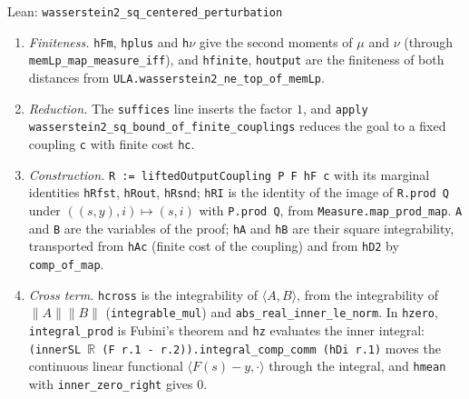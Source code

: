\documentclass[11pt,a4paper]{article}
\begin{document}
\begin{leanbox}{Lean: \texttt{wasserstein2\_\allowbreak{}sq\_\allowbreak{}centered\_\allowbreak{}perturbation}}
\begin{enumerate}


\item \emph{Finiteness.} \texttt{h\allowbreak{}Fm}, \texttt{hplus} and \texttt{h\ensuremath{\nu}} give the second moments of \(\mu\) and \(\nu\) (through \texttt{mem\allowbreak{}Lp\_\allowbreak{}map\_\allowbreak{}measure\_\allowbreak{}iff}), and \texttt{hfinite}, \texttt{houtput} are the finiteness of both distances from \texttt{ULA.\allowbreak{}wasserstein2\_\allowbreak{}ne\_\allowbreak{}top\_\allowbreak{}of\_\allowbreak{}mem\allowbreak{}Lp}.

\item \emph{Reduction.} The \texttt{suffices} line inserts the factor \(1\), and \texttt{apply wasserstein2\_\allowbreak{}sq\_\allowbreak{}bound\_\allowbreak{}of\_\allowbreak{}finite\_\allowbreak{}couplings} reduces the goal to a fixed coupling \texttt{c} with finite cost \texttt{hc}.

\item \emph{Construction.} \texttt{R := lifted\allowbreak{}Output\allowbreak{}Coupling P F h\allowbreak{}F c} with its marginal identities \texttt{h\allowbreak{}Rfst}, \texttt{h\allowbreak{}Rout}, \texttt{h\allowbreak{}Rsnd}; \texttt{h\allowbreak{}RI} is the identity of the image of \texttt{R.\allowbreak{}prod Q} under \(((s,y),i)\mapsto(s,i)\) with \texttt{P.\allowbreak{}prod Q}, from \texttt{Measure.\allowbreak{}map\_\allowbreak{}prod\_\allowbreak{}map}. \texttt{A} and \texttt{B} are the variables of the proof; \texttt{h\allowbreak{}A} and \texttt{h\allowbreak{}B} are their square integrability, transported from \texttt{h\allowbreak{}Ac} (finite cost of the coupling) and from \texttt{h\allowbreak{}D2} by \texttt{comp\_\allowbreak{}of\_\allowbreak{}map}.

\item \emph{Cross term.} \texttt{hcross} is the integrability of \(\langle A,B\rangle\), from the integrability of \(\|A\|\|B\|\) (\texttt{integrable\_\allowbreak{}mul}) and \texttt{abs\_\allowbreak{}real\_\allowbreak{}inner\_\allowbreak{}le\_\allowbreak{}norm}. In \texttt{hzero}, \texttt{integral\_\allowbreak{}prod} is Fubini's theorem and \texttt{hz} evaluates the inner integral: \texttt{(inner\allowbreak{}SL \ensuremath{\mathbb R} (F r.\allowbreak{}1 -\allowbreak{} r.\allowbreak{}2)).\allowbreak{}integral\_\allowbreak{}comp\_\allowbreak{}comm (h\allowbreak{}Di r.\allowbreak{}1)} moves the continuous linear functional \(\langle F(s)-y,\cdot\rangle\) through the integral, and \texttt{hmean} with \texttt{inner\_\allowbreak{}zero\_\allowbreak{}right} gives \(0\).


\end{enumerate}
\end{leanbox}
\end{document}
